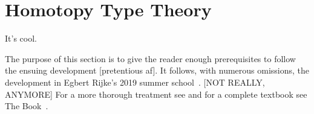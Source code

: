 \chapter{Homotopy Type Theory}
It's cool.~\cite{hottbook}

The purpose of this section is to give the reader enough prerequisites to follow the
ensuing development [pretentious af]. It follows, with numerous omissions, the
development in Egbert Rijke's 2019 summer school~\cite{Rijke2019}. [NOT REALLY, ANYMORE]
For a more thorough treatment see \autocite{Rijke2012} and for a complete
textbook see The Book~\cite{hottbook}.
